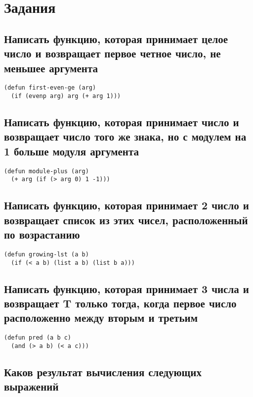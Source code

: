 \chapter{Задания}

\section{Написать функцию, которая принимает целое число и возвращает первое четное число, не меньшее аргумента}

\begin{lstlisting}
(defun first-even-ge (arg)
  (if (evenp arg) arg (+ arg 1)))
\end{lstlisting}

\section{Написать функцию, которая принимает число и возвращает число того же знака, но с модулем на 1 больше модуля аргумента}

\begin{lstlisting}
(defun module-plus (arg)
  (+ arg (if (> arg 0) 1 -1)))
\end{lstlisting}

\section{Написать функцию, которая принимает 2 число и возвращает список из этих чисел, расположенный по возрастанию}

\begin{lstlisting}
(defun growing-lst (a b)
  (if (< a b) (list a b) (list b a)))
\end{lstlisting}

\section{Написать функцию, которая принимает 3 числа и возвращает T только тогда, когда первое число расположенно между вторым и третьим}

\begin{lstlisting}
(defun pred (a b c)
  (and (> a b) (< a c)))
\end{lstlisting}

\section{Каков результат вычисления следующих выражений}

